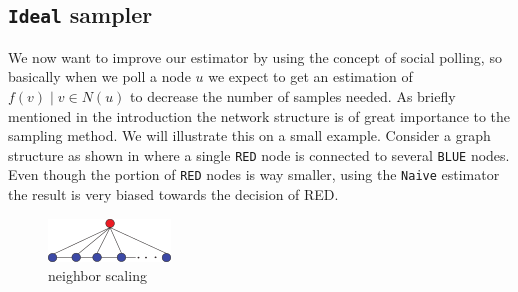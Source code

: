 \subsection{\texttt{Ideal} sampler}
We now want to improve our estimator by using the concept of social polling, so basically when we poll a node $u$ we expect to get an estimation of ${f(v)\;|\;v \in N(u)}$ to decrease the number of samples needed.
As briefly mentioned in the introduction the network structure is of great importance to the sampling method.
We will illustrate this on a small example. Consider a graph structure as shown in  where a single \texttt{RED} node is connected to several \texttt{BLUE} nodes.
Even though the portion of \texttt{RED} nodes is way smaller, using the \texttt{Naive} estimator the result is very biased towards the decision of {RED}.
\begin{figure}[!ht]
  \begin{center}
    \includegraphics{fig1a}
    \caption{neighbor scaling}
    \label{fig:}
  \end{center}
\end{figure}

